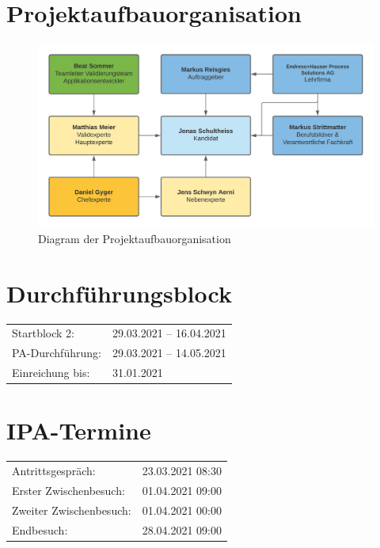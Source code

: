 \section{Projektaufbauorganisation}

\begin{figure}[!ht]
  \centering
  \includegraphics[width=.95\linewidth]{./images/Projektaufbauorganisation.png}
  \caption[Diagram der Projektaufbauorganisation]{Diagram der Projektaufbauorganisation}
  \label{fig:projektaufbauorganisation}
\end{figure}
\pagebreak
\section{Durchführungsblock}

\begin{table}[htp]
  \begin{tabularx}{\textwidth}{l X}
    Startblock 2: & 29.03.2021 – 16.04.2021\\
    PA-Durchführung: & 29.03.2021 – 14.05.2021 \\
    Einreichung bis: & 31.01.2021 \\
  \end{tabularx}
\end{table}

\section{IPA-Termine}

\begin{table}[htp]
  \begin{tabularx}{\textwidth}{l X}
    Antrittsgespräch: & 23.03.2021 08:30 \\
    Erster Zwischenbesuch: & 01.04.2021 09:00 \\
    Zweiter Zwischenbesuch: & 01.04.2021 00:00 \\
    Endbesuch: & 28.04.2021 09:00 \\
  \end{tabularx}
\end{table}